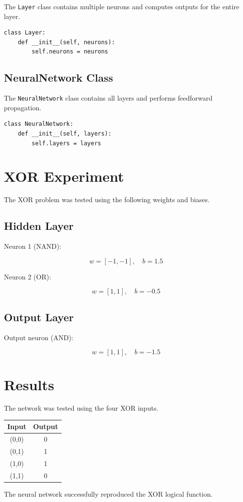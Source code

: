 \documentclass{article}
\begin{document}
The \texttt{Layer} class contains multiple neurons and computes outputs for the entire layer.

\begin{lstlisting}
class Layer:
    def __init__(self, neurons):
        self.neurons = neurons
\end{lstlisting}


\subsection{NeuralNetwork Class}

The \texttt{NeuralNetwork} class contains all layers and performs feedforward propagation.

\begin{lstlisting}
class NeuralNetwork:
    def __init__(self, layers):
        self.layers = layers
\end{lstlisting}


\section{XOR Experiment}
The XOR problem was tested using the following weights and biases.

\subsection{Hidden Layer}

Neuron 1 (NAND):

\[
w = [-1, -1], \quad b = 1.5
\]

Neuron 2 (OR):

\[
w = [1, 1], \quad b = -0.5
\]

\subsection{Output Layer}

Output neuron (AND):

\[
w = [1, 1], \quad b = -1.5
\]

\section{Results}

The network was tested using the four XOR inputs.

\begin{center}
\begin{tabular}{|c|c|}
\hline
Input & Output \\
\hline
(0,0) & 0 \\
(0,1) & 1 \\
(1,0) & 1 \\
(1,1) & 0 \\
\hline
\end{tabular}
\end{center}

The neural network successfully reproduced the XOR logical function.
\end{document}
